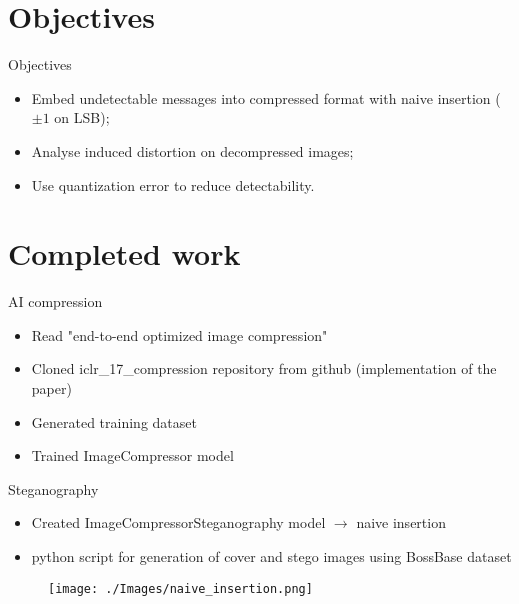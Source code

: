 \documentclass[11pt,compress]{beamer} %
\begin{document}
\section{Objectives}
\begin{frame}{Objectives}
  \begin{itemize}
    \item Embed undetectable messages into compressed format with naive insertion ($\pm1$ on LSB);
    \item Analyse induced distortion on decompressed images;
    \item Use quantization error to reduce detectability.
  \end{itemize}
\end{frame}


\section{Completed work}
\begin{frame}{AI compression}
  \begin{itemize}
    \item Read "\lowercase{END-TO-END OPTIMIZED IMAGE COMPRESSION}"
    \item Cloned iclr\_17\_compression repository from github (implementation of the paper)
    \item Generated training dataset
    \item Trained ImageCompressor model
  \end{itemize}
\end{frame}

\begin{frame}{Steganography}
  \begin{itemize}
    \item Created ImageCompressorSteganography model $\rightarrow$ naive insertion
    \item python script for generation of cover and stego images using BossBase dataset
  \end{itemize}
  \begin{figure}
    \texttt{[image: ./Images/naive\_insertion.png]}
  \end{figure}
\end{frame}
\end{document}
